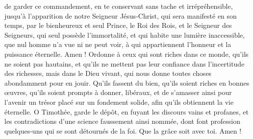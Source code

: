 \begin{multicols}{2}
de garder ce commandement, en te conservant sans tache et irrépréhensible, jusqu’à l'apparition de notre Seigneur Jésus-Christ,
qui sera manifesté en son temps, par le bienheureux et seul Prince, le Roi des Rois, et le Seigneur des Seigneurs,
qui seul possède l'immortalité, et qui habite une lumière inaccessible, que nul homme n'a vue ni ne peut voir, à qui appartiennent l'honneur et la puissance éternelle. Amen !
Ordonne à ceux qui sont riches dans ce monde, qu'ils ne soient pas hautains, et qu'ils ne mettent pas leur confiance dans l'incertitude des richesses, mais dans le Dieu vivant, qui nous donne toutes choses abondamment pour en jouir.
Qu'ils fassent du bien, qu'ils soient riches en bonnes œuvres, qu'ils soient prompts à donner, libéraux,
et de s’amasser ainsi pour l'avenir un trésor placé sur un fondement solide, afin qu'ils obtiennent la vie éternelle.
\TextTitle{[Conclusion]}
O Timothée, garde le dépôt, en fuyant les discours vains et profanes, et les contradictions d'une science faussement ainsi nommée,
dont font profession quelques-uns qui se sont détournés de la foi. Que la grâce soit avec toi. Amen !
\PPE{}
\end{multicols}

